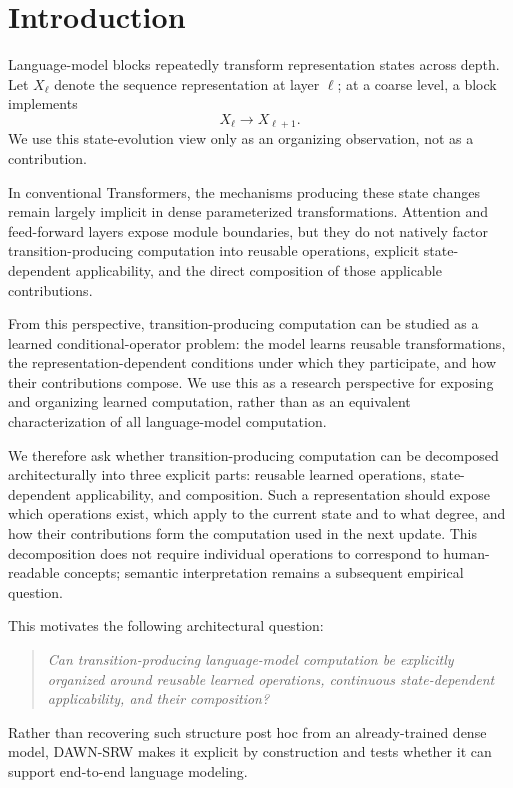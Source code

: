 \documentclass{article}
\newcommand{\DAWN}{DAWN-SRW}
\begin{document}
\section{Introduction}
\label{sec:introduction}

Language-model blocks repeatedly transform representation states across depth.
Let \(X_\ell\) denote the sequence representation at layer \(\ell\); at a
coarse level, a block implements
\[
X_\ell\longrightarrow X_{\ell+1}.
\]
We use this state-evolution view only as an organizing observation, not as a
contribution.

In conventional Transformers, the mechanisms producing these state changes
remain largely implicit in dense parameterized transformations. Attention and
feed-forward layers expose module boundaries, but they do not natively factor
transition-producing computation into reusable operations, explicit
state-dependent applicability, and the direct composition of those applicable
contributions.

From this perspective, transition-producing computation can be studied as a
learned conditional-operator problem: the model learns reusable transformations,
the representation-dependent conditions under which they participate, and how
their contributions compose. We use this as a research perspective for exposing
and organizing learned computation, rather than as an equivalent characterization
of all language-model computation.

We therefore ask whether transition-producing computation can be decomposed
architecturally into three explicit parts: reusable learned operations,
state-dependent applicability, and composition. Such a representation should
expose which operations exist, which apply to the current state and to what
degree, and how their contributions form the computation used in the next
update. This decomposition does not require individual operations to correspond
to human-readable concepts; semantic interpretation remains a subsequent
empirical question.

This motivates the following architectural question:
\begin{quote}
\emph{Can transition-producing language-model computation be explicitly
organized around reusable learned operations, continuous state-dependent
applicability, and their composition?}
\end{quote}

Rather than recovering such structure post hoc from an already-trained dense
model, \DAWN{} makes it explicit by construction and tests whether it can
support end-to-end language modeling.
\end{document}
